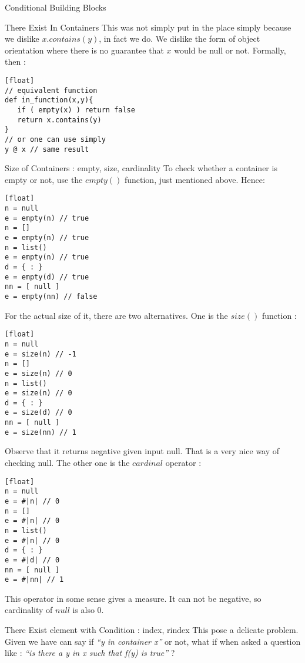 \begin{section}{Conditional Building Blocks}
\begin{subsection}{There Exist In Containers}
This was not simply put in the place simply because we dislike $x.contains(y)$, in fact we do.
We dislike the form of object orientation where there is no guarantee that $x$ would be null or not.
Formally, then :

\begin{lstlisting}[style=JexlStyle][float]
// equivalent function 
def in_function(x,y){
   if ( empty(x) ) return false 
   return x.contains(y) 
}
// or one can use simply 
y @ x // same result
\end{lstlisting}
\end{subsection}

\begin{subsection}{Size of Containers : empty, size, cardinality}
To check whether a container is empty or not, 
use the $empty()$  function, just mentioned above. Hence:
\begin{lstlisting}[style=JexlStyle][float]
n = null
e = empty(n) // true 
n = []
e = empty(n) // true 
n = list()
e = empty(n) // true 
d = { : }
e = empty(d) // true 
nn = [ null ]
e = empty(nn) // false 
\end{lstlisting}

For the actual size of it, there are two alternatives.
One is the $size()$   function :

\begin{lstlisting}[style=JexlStyle][float]
n = null
e = size(n) // -1 
n = []
e = size(n) // 0 
n = list()
e = size(n) // 0 
d = { : }
e = size(d) // 0 
nn = [ null ]
e = size(nn) // 1 
\end{lstlisting}

Observe that it returns negative given input null. 
That is a very nice way of checking null.
The other one is the $cardinal$ operator :

\begin{lstlisting}[style=JexlStyle][float]
n = null
e = #|n| // 0 
n = []
e = #|n| // 0 
n = list()
e = #|n| // 0 
d = { : }
e = #|d| // 0 
nn = [ null ]
e = #|nn| // 1 
\end{lstlisting}
This operator in some sense gives a measure. It can not be negative, 
so cardinality of $null$ is also 0. 
\end{subsection}

\begin{subsection}{There Exist element with Condition : index, rindex }
This pose a delicate problem. Given we have can say if \emph{``y in container x''} or not,
what if when asked a question like : \emph{ ``is there a y in x such that f(y) is true''} ?


\end{subsection}
\end{section}
